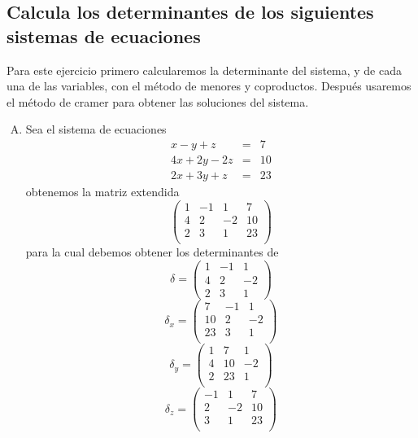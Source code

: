\documentclass[12pt]{article}
\begin{document}
\subsection*{Calcula los determinantes de los siguientes sistemas de ecuaciones}

	\par Para este ejercicio primero calcularemos la determinante del sistema, y de cada una de las variables, con el m\'etodo de menores y coproductos. Despu\'es usaremos el m\'etodo de cramer para obtener las soluciones del sistema.
	
\begin{multicols}{2}
	\begin{enumerate}[A.]
		\item Sea el sistema de ecuaciones
			\begin{eqnarray*}
				x-y+z&=&7 \\
				4x+2y-2z&=&10 \\
				2x+3y+z&=&23
			\end{eqnarray*}
		obtenemos la matriz extendida
			$$\begin{pmatrix}
				1  & -1 &  1 &  7\\
				4  &  2 & -2 & 10\\
				2  &  3 &  1 & 23\\
			\end{pmatrix} $$
		para la cual debemos obtener los determinantes de
			$$\delta = \begin{pmatrix}
				1  & -1 &  1 \\
				4  &  2 & -2 \\
				2  &  3 &  1 
			\end{pmatrix} $$
			$$\delta_x = \begin{pmatrix}
				 7  & -1 &  1 \\
				10  &  2 & -2 \\
				23  &  3 &  1 \\
			\end{pmatrix} $$
			$$\delta_y = \begin{pmatrix}
				1  &  7 &  1 \\
				4  & 10 & -2 \\
				2  & 23 &  1 \\
			\end{pmatrix} $$
			$$\delta_z = \begin{pmatrix}
				-1 &  1 &  7\\
				 2 & -2 & 10\\
				 3 &  1 & 23\\
			\end{pmatrix} $$

\end{enumerate}
\end{multicols}
\end{document}
